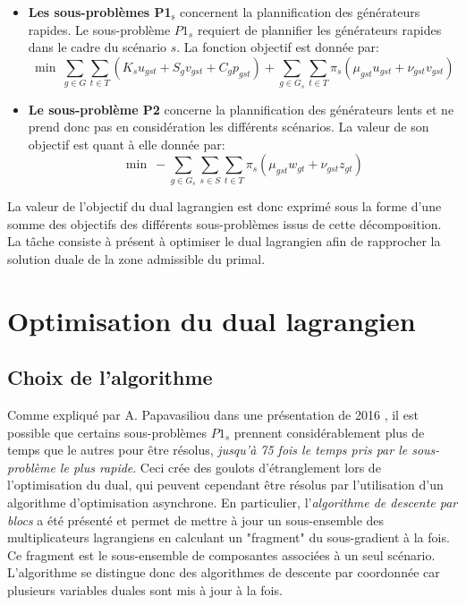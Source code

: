 \begin{itemize}
    \item \textbf{Les sous-problèmes P1$_{\text{s}}$} concernent la plannification des générateurs rapides.
    Le sous-problème $P1_s$ requiert de plannifier les générateurs rapides dans le cadre du scénario $s$.
    La fonction objectif est donnée par:
    \begin{equation}
        \min \ \sum\limits_{g \in G} \sum\limits_{t \in T} (K_s u_{gst} + S_g v_{gst} + C_g p_{gst}) + \sum\limits_{g \in G_s} \sum\limits_{t \in T} \pi_s (\mu_{gst} u_{gst} + \nu_{gst} v_{gst})
    \end{equation}
    \item \textbf{Le sous-problème P2} concerne la plannification des générateurs lents et ne prend donc pas
    en considération les différents scénarios. La valeur de son objectif est quant à elle donnée par:
    \begin{equation}
        \min \ - \sum\limits_{g \in G_s} \sum\limits_{s \in S} \sum\limits_{t \in T} \pi_s (\mu_{gst} w_{gt} + \nu_{gst} z_{gt})
    \end{equation}
\end{itemize}

La valeur de l'objectif du dual lagrangien est donc exprimé sous la forme d'une somme des objectifs des différents sous-problèmes
issus de cette décomposition. La tâche consiste à présent à optimiser le dual lagrangien afin de rapprocher la solution duale de la
zone admissible du primal.

\section{Optimisation du dual lagrangien}

\subsection{Choix de l'algorithme}

Comme expliqué par A. Papavasiliou dans une présentation de 2016 \citep{Asynchronous},
il est possible que certains sous-problèmes $P1_s$ prennent considérablement plus de temps que le autres pour être résolus, \textit{jusqu'à
75 fois le temps pris par le sous-problème le plus rapide}. Ceci crée des goulots d'étranglement lors de l'optimisation du dual,
qui peuvent cependant être résolus par l'utilisation d'un algorithme d'optimisation asynchrone.
En particulier, l'\textit{algorithme de descente par blocs} a été présenté et permet de mettre à jour un sous-ensemble des multiplicateurs
lagrangiens en calculant un "fragment" du sous-gradient à la fois. Ce fragment est le sous-ensemble de composantes associées à un seul
scénario. L'algorithme se distingue donc des algorithmes de descente par coordonnée car plusieurs variables duales sont mis à jour
à la fois.

